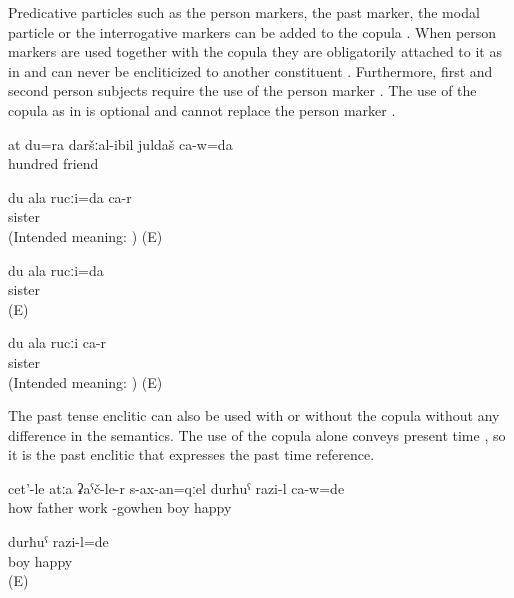 Predicative particles such as the person markers, the past marker, the modal particle or the interrogative markers can be added to the copula . When person markers are used together with the copula they are obligatorily attached to it as in  and can never be encliticized to another constituent . Furthermore, first and second person subjects require the use of the person marker . The use of the copula as in  is optional and cannot replace the person marker .
%
\begin{exe}
	\ex	\label{ex:‎‎I am your 100th friend}
	\gll	at	du=ra	daršːal-ibil	juldaš	ca-w=da\\
				hundred	friend	\\
	\glt	{}

	\ex	\label{ex:ungrammaticalIamyoursisterA}
	\gll	*du ala rucːi=da ca-r\\
		\hphantom{*}		sister	\\
	\glt	(Intended meaning: ) (E)


	\ex	\label{ex:ungrammaticalIamyoursisterA_1}
	\gll	du ala rucːi=da \\
				sister	\\
	\glt	{} (E)
	
	
	\ex	\label{ex:ungrammaticalIamyoursisterB}
	\gll	*du ala rucːi ca-r\\
		\hphantom{*}		sister	\\
	\glt	(Intended meaning: ) (E)
\end{exe}

The past tense enclitic can also be used with  or without the copula  without any difference in the semantics. The use of the copula alone conveys present time , so it is the past enclitic that expresses the past time reference. 
%
\begin{exe}
	\ex	\label{ex:‎When the father came back from work, the boy was happy}
	\gll	cet'-le	atːa	ʡaˁč-le-r	s-ax-an=qːel	durħuˁ	razi-l	ca-w=de\\
		how	father	work	-gowhen	boy	happy	\\
	\glt	{}

	\ex	\label{ex:The boy was happy.COP}
	\gll	durħuˁ	razi-l=de\\
		boy	happy\\
	\glt	{} (E)
\end{exe}

